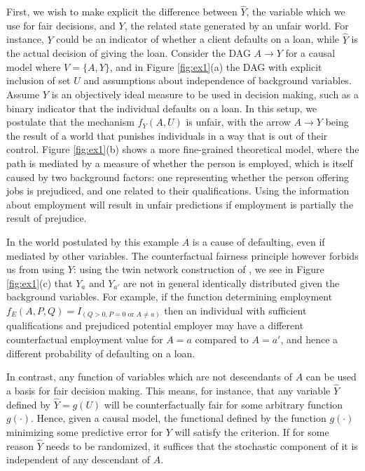 First, we wish to make explicit the difference between $\hat Y$, the
variable which we use for fair decisions, and $Y$, the related state
generated by an unfair world. For instance, $Y$ could be an indicator
of whether a client defaults on a loan, while $\hat Y$ is the actual
decision of giving the loan. Consider the DAG $A \rightarrow Y$ for a
causal model where $V = \{A, Y\}$, and in Figure \ref{fig:ex1}(a) the
DAG with explicit inclusion of set $U$ and assumptions about
independence of background variables. Assume $Y$ is an objectively
ideal measure to be used in decision making, such as a binary
indicator that the individual defaults on a loan. In this setup, we
postulate that the mechanism $f_Y(A, U)$ is unfair, with the arrow
$A \rightarrow Y$ being the result of a world that punishes
individuals in a way that is out of their control. Figure
\ref{fig:ex1}(b) shows a more fine-grained theoretical model, where
the path is mediated by a measure of whether the person is employed,
which is itself caused by two background factors: one representing
whether the person offering jobs is prejudiced, and one related to
their qualifications. Using the information about employment will
result in unfair predictions if employment is partially the result of
prejudice.

In the world  postulated by this example 
$A$ is a cause of defaulting, even if mediated by other
variables. The counterfactual fairness principle however forbids us
from using $Y$: using the twin network construction of
\citet{pearl:00}, we see in Figure \ref{fig:ex1}(c) that $Y_a$ and
$Y_{a'}$ are not in general identically distributed given the
background variables.
For example, if the function determining employment
$f_E(A,P,Q) = I_{(Q > 0, P = 0 \text{ or } A \neq a)}$ then an individual
with sufficient qualifications and prejudiced potential employer
may have a different counterfactual
employment value for $A = a$ compared to $A = a'$, and hence a
different probability of defaulting on a loan.


In contrast, any function of variables which are not descendants of
$A$ can be used a basis for fair decision making. This means, for instance,
that any variable $\hat Y$ defined by $\hat Y = g(U)$ will be counterfactually
fair for some arbitrary function $g(\cdot)$. Hence, given a causal
model, the functional defined by the function $g(\cdot)$ 
minimizing some predictive error for $Y$ will satisfy the criterion.
If for some reason $\hat Y$ needs to be randomized, it suffices that the
stochastic component of it is independent of any descendant of $A$.

